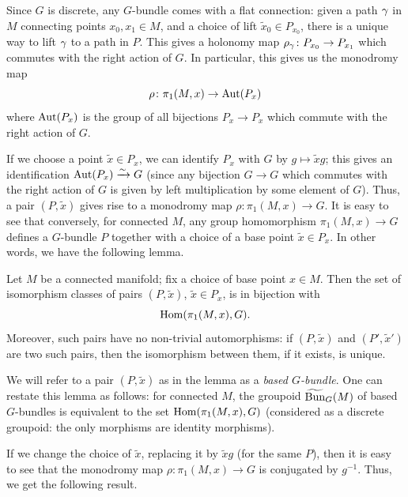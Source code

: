 Since $G$ is discrete, any $G$-bundle comes with a flat connection: given a
path $\gamma$ in $M$ connecting points $x_0, x_1\in M$, and a choice of lift
$\tilde x_0\in P_{x_0}$, there is a unique way to lift $\gamma$ to a path in $P$.
This gives a holonomy map $\rho_\gamma \colon P_{x_0} \to P_{x_1}$ which commutes
with the right action of $G$. In particular, this gives us the monodromy map
\begin{equation}\label{e:monodromy}
  \rho \colon \pi_1(M,x)\to \operatorname{Aut}(P_x)
\end{equation}
where $\operatorname{Aut}(P_x)$ is the group of all bijections $P_x\to P_x$ which commute with
the right action of $G$.

If we choose a point $\tilde x\in P_x$, we can identify $P_x$ with $G$ by
$g\mapsto \tilde x g$; this gives an identification $\operatorname{Aut}(P_x)\xrightarrow{\sim} G$
(since any bijection $G\to G$ which commutes with the right action of $G$
is given by left multiplication by some element of $G$). Thus, a pair $(P,
\tilde x)$ gives rise to a monodromy map $\rho \colon \pi_1(M,x)\to G$. It
is easy to see that conversely, for connected $M$, any group homomorphism
$\pi_1(M,x)\to G$ defines a $G$-bundle $P$ together with a choice of a base
point $\tilde x \in P_x$. In other words, we have the following lemma.

\begin{lemma}\label{l:monodromy1}
  Let $M$ be a connected manifold; fix a choice of base point $x\in M$.
  Then the set of isomorphism classes of pairs $(P, \tilde x)$,
  $\tilde x\in P_x$, is in bijection with
  $$
  \operatorname{Hom}(\pi_1(M,x),G).
  $$
  Moreover, such pairs have no non-trivial automorphisms: if $(P, \tilde x)$
  and $(P', \tilde x')$ are two such pairs, then the isomorphism between them,
  if it exists, is unique.
\end{lemma}

We will refer to a pair $(P, \tilde x)$ as in the lemma as a
\emph{based $G$-bundle}. One can restate
this lemma as follows: for connected $M$, the groupoid $\widetilde{\operatorname{Bun}}_G(M)$
of based $G$-bundles is equivalent to the set
$\operatorname{Hom}(\pi_1(M,x), G)$ (considered as a discrete groupoid: the only morphisms
are identity morphisms).

If we change the choice of $\tilde x$, replacing it by $\tilde x g$ (for the
same $P$), then it is easy to see that the monodromy map
$\rho\colon \pi_1(M,x)\to G$ is conjugated by $g^{-1}$. Thus, we get the
following result.

